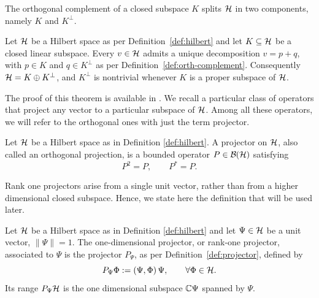 \noindent The orthogonal complement of a closed subspace $K$ splits $\H$ in two components, namely $K$ and $K^{\perp}$.

\begin{theorem}\label{thm:orth-decomp}
	Let $\H$ be a Hilbert space as per Definition~\ref{def:hilbert} and let $K\subseteq\H$ be a closed linear subspace. Every $v\in\H$ admits a unique decomposition $v=p+q$, with $p\in K$ and $q\in K^{\perp}$ as per Definition~\ref{def:orth-complement}. Consequently $\H=K\oplus K^{\perp}$, and $K^{\perp}$ is nontrivial whenever $K$ is a proper subspace of $\H$.
\end{theorem}

The proof of this theorem is available in \cite[Theorem 3.13]{morettiSpectralTheoryQuantum}. We recall a particular class of operators that project any vector to a particular subspace of $\H$. Among all these operators, we will refer to the orthogonal ones with just the term projector.

\begin{definition}[Projector]
	\label{def:projector}
	Let $\H$ be a Hilbert space as in Definition \ref{def:hilbert}. A projector on $\H$, also called an orthogonal projection, is a bounded operator $P \in \mathcal B(\H)$ satisfying
	\begin{equation}
		P^2 = P, \qquad P^* = P.
	\end{equation}
\end{definition}

\noindent Rank one projectors arise from a single unit vector, rather than from a higher dimensional closed subspace. Hence, we state here the definition that will be used later.

\begin{definition}
	\label{def:one-dimensional-projector}
	Let $\H$ be a Hilbert space as in Definition \ref{def:hilbert} and let $\Psi \in \H$ be a unit vector, $\|\Psi\|=1$. The one-dimensional projector, or rank-one projector, associated to $\Psi$ is the projector $P_\Psi$, as per Definition~\ref{def:projector}, defined by
	\begin{equation}
		P_\Psi \Phi := (\Psi,\Phi)\,\Psi, \qquad \forall \Phi \in \H.
	\end{equation}
	Its range $P_\Psi\H$ is the one dimensional subspace $\mathbb{C} \Psi$ spanned by $\Psi$.
\end{definition}

